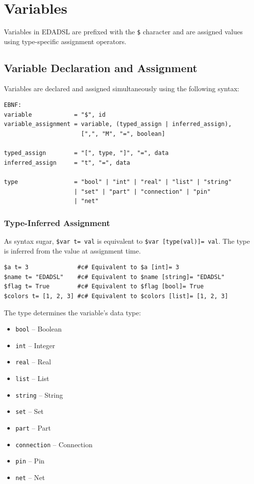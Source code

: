 \documentclass{report}
\begin{document}
\chapter{Variables}
Variables in EDADSL are prefixed with the \texttt{\$} character and are assigned values using type-specific assignment operators.

\section{Variable Declaration and Assignment}
Variables are declared and assigned simultaneously using the following syntax:
\begin{verbatim}
EBNF:
variable            = "$", id
variable_assignment = variable, (typed_assign | inferred_assign),
                      [",", "M", "=", boolean]

typed_assign        = "[", type, "]", "=", data
inferred_assign     = "t", "=", data

type                = "bool" | "int" | "real" | "list" | "string" 
                    | "set" | "part" | "connection" | "pin" 
                    | "net"
\end{verbatim}

\subsection{Type-Inferred Assignment}
As syntax sugar, \texttt{\$var t= val} is equivalent to \texttt{\$var [type(val)]= val}. The type is inferred from the value at assignment time.
\begin{verbatim}
$a t= 3              #c# Equivalent to $a [int]= 3
$name t= "EDADSL"    #c# Equivalent to $name [string]= "EDADSL"
$flag t= True        #c# Equivalent to $flag [bool]= True
$colors t= [1, 2, 3] #c# Equivalent to $colors [list]= [1, 2, 3]
\end{verbatim}

The type determines the variable's data type:
\begin{itemize}
\item \texttt{bool} -- Boolean
\item \texttt{int} -- Integer
\item \texttt{real} -- Real
\item \texttt{list} -- List
\item \texttt{string} -- String
\item \texttt{set} -- Set
\item \texttt{part} -- Part
\item \texttt{connection} -- Connection
\item \texttt{pin} -- Pin
\item \texttt{net} -- Net
\end{itemize}
\end{document}
